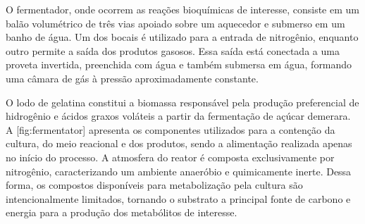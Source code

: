 \startsection[title={Fermentador}]
	O fermentador, onde ocorrem as reações bioquímicas de interesse, consiste em um balão volumétrico de três vias apoiado sobre um aquecedor e submerso em um banho de água. Um dos bocais é utilizado para a entrada de nitrogênio, enquanto outro permite a saída dos produtos gasosos. Essa saída está conectada a uma proveta invertida, preenchida com água e também submersa em água, formando uma câmara de gás à pressão aproximadamente constante.

	\startplacefigure[title={Ilustração do fermentador}, reference={fig:fermentator}]
	\stopplacefigure

	O lodo de gelatina constitui a biomassa responsável pela produção preferencial de hidrogênio e ácidos graxos voláteis a partir da fermentação de açúcar demerara. A [fig:fermentator] apresenta os componentes utilizados para a contenção da cultura, do meio reacional e dos produtos, sendo a alimentação realizada apenas no início do processo. A atmosfera do reator é composta exclusivamente por nitrogênio, caracterizando um ambiente anaeróbio e quimicamente inerte. Dessa forma, os compostos disponíveis para metabolização pela cultura são intencionalmente limitados, tornando o substrato a principal fonte de carbono e energia para a produção dos metabólitos de interesse.
\stopsection

